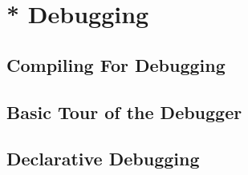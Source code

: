 \section{* Debugging}
\subsection{Compiling For Debugging}
\subsection{Basic Tour of the Debugger}
\subsection{Declarative Debugging}




